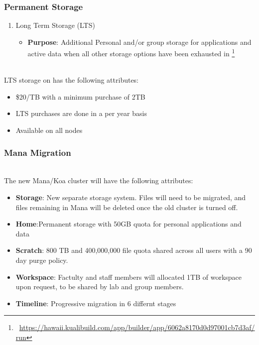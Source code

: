 \begin{frame}
  \frametitle{Permanent Storage }
  \begin{enumerate}
  \item Long Term Storage (LTS)
    \begin{itemize}
    \item {\textbf{Purpose}}: \footnotesize Additional Personal and/or group storage for applications and active data when all other storage options have been exhausted in {\mana}\footnote{\label{LTS}\tiny\ \url{https://hawaii.kualibuild.com/app/builder/app/6062a8170d0d97001cb7d3af/run}}
    
    \end{itemize}
  \end{enumerate}
~\\
  LTS storage on {\mana} has the following attributes:
  \begin{itemize}
  \item \$20/TB with a minimum purchase of 2TB 
  \item LTS purchases are done in a per year basis
  \item Available on all nodes
  \end{itemize}

\end{frame}

\begin{frame}
  \frametitle{Mana Migration}
~\\
  The new Mana/Koa cluster will have the following attributes:
  \begin{itemize}
	  \item {\textbf{Storage}}: New separate storage system. Files will need to be migrated, and files remaining in Mana will be deleted once the old cluster is turned off. 
	  \item{\textbf{Home}}:Permanent storage with 50GB quota for personal applications and data
	  \item{\textbf{Scratch}}: 800 TB and 400,000,000 file quota shared across all users with a 90 day purge policy. 
  \item{\textbf{Workspace}}: Factulty and staff members will allocated 1TB of workspace upon request, to be shared by lab and group members. 
  \item {\textbf{Timeline}}: Progressive migration in 6 differnt stages \footnotemark
  \end{itemize}

\end{frame}

